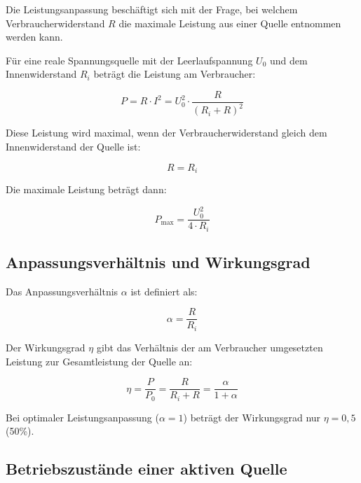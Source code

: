 \documentclass[
  11pt,
]{article}
\begin{document}
Die Leistungsanpassung beschäftigt sich mit der Frage, bei welchem
Verbraucherwiderstand \(R\) die maximale Leistung aus einer Quelle
entnommen werden kann.

Für eine reale Spannungsquelle mit der Leerlaufspannung \(U_0\) und dem
Innenwiderstand \(R_i\) beträgt die Leistung am Verbraucher:

\[P = R \cdot I^2 = U_0^2 \cdot \frac{R}{(R_i + R)^2}\]

Diese Leistung wird maximal, wenn der Verbraucherwiderstand gleich dem
Innenwiderstand der Quelle ist:

\[R = R_i\]

Die maximale Leistung beträgt dann:

\[P_\text{max} = \frac{U_0^2}{4 \cdot R_i}\]

\subsection{Anpassungsverhältnis und
Wirkungsgrad}\label{anpassungsverhuxe4ltnis-und-wirkungsgrad}

Das Anpassungsverhältnis \(\alpha\) ist definiert als:

\[\alpha = \frac{R}{R_i}\]

Der Wirkungsgrad \(\eta\) gibt das Verhältnis der am Verbraucher
umgesetzten Leistung zur Gesamtleistung der Quelle an:

\[\eta = \frac{P}{P_0} = \frac{R}{R_i + R} = \frac{\alpha}{1 + \alpha}\]

Bei optimaler Leistungsanpassung (\(\alpha = 1\)) beträgt der
Wirkungsgrad nur \(\eta = 0,5\) (50\%).

\subsection{Betriebszustände einer aktiven
Quelle}\label{betriebszustuxe4nde-einer-aktiven-quelle}
\end{document}
